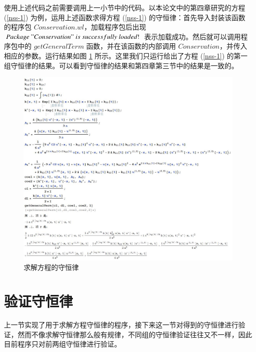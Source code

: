 使用上述代码之前需要调用上一小节中的代码。以本论文中的第四章研究的方程 (\ref{nss-1}) 为例，运用上述函数求得方程 (\ref{nss-1}) 的守恒律：首先导入封装该函数的程序包 $Conservation.wl$，加载程序包后出现 $Package \ "Conservation" \ is \ successfully \  loaded!$ 表示加载成功。然后就可以调用程序包中的 $getGeneralTerm$ 函数，并在该函数的内部调用 $Conservation$，并传入相应的参数。运行结果如图 \ref{picture-5-2} 所示。这里我们只运行给出了方程 (\ref{nss-1}) 的第一组守恒律的结果。可以看到守恒律的结果和第四章第三节中的结果是一致的。
\begin{figure}[!htp]
\centering
\includegraphics[width=\linewidth]{getConservation.jpg}
\caption{求解方程的守恒律}
\label{picture-5-2}
\end{figure}

\section{验证守恒律}
上一节实现了用于求解方程守恒律的程序，接下来这一节对得到的守恒律进行验证，然而不像求解守恒律那么般有规律，不同组的守恒律验证往往又不一样，因此目前程序只对前两组守恒律进行验证。

